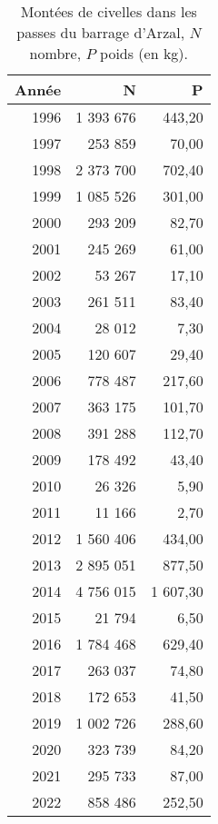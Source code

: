 \begin{table}[htbp]
\centering
\begin{tabular}{rrr}
  \hline
Année & N & P \\ 
  \hline
1996 & 1 393 676 & 443,20 \\ 
  1997 & 253 859 & 70,00 \\ 
  1998 & 2 373 700 & 702,40 \\ 
  1999 & 1 085 526 & 301,00 \\ 
  2000 & 293 209 & 82,70 \\ 
  2001 & 245 269 & 61,00 \\ 
  2002 & 53 267 & 17,10 \\ 
  2003 & 261 511 & 83,40 \\ 
  2004 & 28 012 & 7,30 \\ 
  2005 & 120 607 & 29,40 \\ 
  2006 & 778 487 & 217,60 \\ 
  2007 & 363 175 & 101,70 \\ 
  2008 & 391 288 & 112,70 \\ 
  2009 & 178 492 & 43,40 \\ 
  2010 & 26 326 & 5,90 \\ 
  2011 & 11 166 & 2,70 \\ 
  2012 & 1 560 406 & 434,00 \\ 
  2013 & 2 895 051 & 877,50 \\ 
  2014 & 4 756 015 & 1 607,30 \\ 
  2015 & 21 794 & 6,50 \\ 
  2016 & 1 784 468 & 629,40 \\ 
  2017 & 263 037 & 74,80 \\ 
  2018 & 172 653 & 41,50 \\ 
  2019 & 1 002 726 & 288,60 \\ 
  2020 & 323 739 & 84,20 \\ 
  2021 & 295 733 & 87,00 \\ 
  2022 & 858 486 & 252,50 \\ 
   \hline
\end{tabular}
\caption{Montées de civelles dans les passes du barrage d'Arzal, $N$ nombre,
				$P$ poids (en kg).} 
\label{table_civelle}
\end{table}
